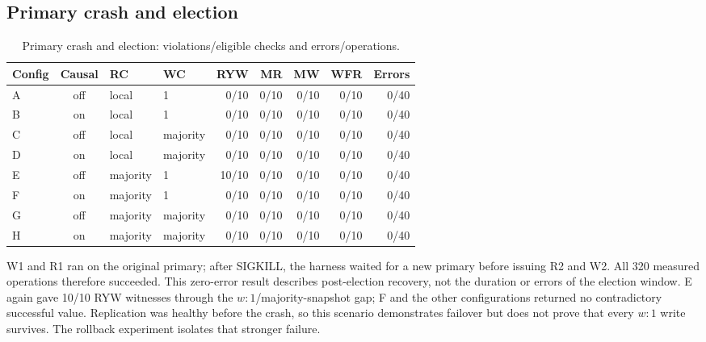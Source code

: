 \documentclass[11pt,a4paper]{article}
\begin{document}
\subsection{Primary crash and election}
\begin{table}[H]
\centering\scriptsize
\caption{Primary crash and election: violations/eligible checks and errors/operations.}
\begin{tabular}{@{}lcllrrrrr@{}}
\toprule Config & Causal & RC & WC & RYW & MR & MW & WFR & Errors\\ \midrule
A & off & local & 1 & 0/10 & 0/10 & 0/10 & 0/10 & 0/40\\
B & on  & local & 1 & 0/10 & 0/10 & 0/10 & 0/10 & 0/40\\
C & off & local & majority & 0/10 & 0/10 & 0/10 & 0/10 & 0/40\\
D & on  & local & majority & 0/10 & 0/10 & 0/10 & 0/10 & 0/40\\
E & off & majority & 1 & 10/10 & 0/10 & 0/10 & 0/10 & 0/40\\
F & on  & majority & 1 & 0/10 & 0/10 & 0/10 & 0/10 & 0/40\\
G & off & majority & majority & 0/10 & 0/10 & 0/10 & 0/10 & 0/40\\
H & on  & majority & majority & 0/10 & 0/10 & 0/10 & 0/10 & 0/40\\ \bottomrule
\end{tabular}
\end{table}

W1 and R1 ran on the original primary; after SIGKILL, the harness waited for a new primary
before issuing R2 and W2. All 320 measured operations therefore succeeded. This zero-error
result describes post-election recovery, not the duration or errors of the election window.
E again gave 10/10 RYW witnesses through the $w:1$/majority-snapshot gap; F and the other
configurations returned no contradictory successful value. Replication was healthy before
the crash, so this scenario demonstrates failover but does not prove that every $w:1$ write
survives. The rollback experiment isolates that stronger failure.
\FloatBarrier
\end{document}
